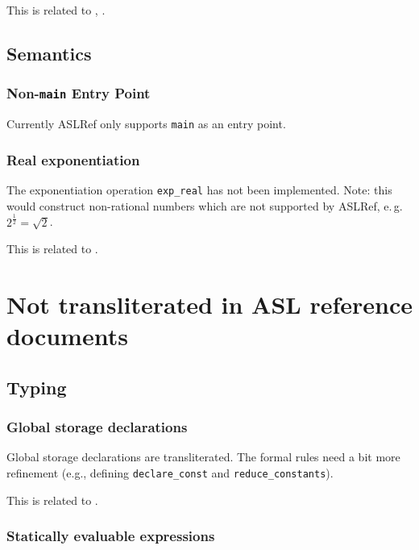 \documentclass{book}
\begin{document}
This is related to , .

\section{Semantics}

\subsection{Non-\texttt{main} Entry Point}
Currently ASLRef only supports \texttt{main} as an entry point.

\subsection{Real exponentiation}

The exponentiation operation \texttt{exp\_real} has not been implemented.
%
Note: this would construct non-rational numbers which are not supported by
ASLRef, e.\,g.\ $2^\frac{1}{2} = \sqrt{2}$.

This is related to .

\chapter{Not transliterated in ASL reference documents}

\section{Typing}

\subsection{Global storage declarations}

Global storage declarations are transliterated.
The formal rules need a bit more refinement (e.g., defining \texttt{declare\_const} and \texttt{reduce\_constants}).

This is related to .

\subsection{Statically evaluable expressions}
\end{document}

